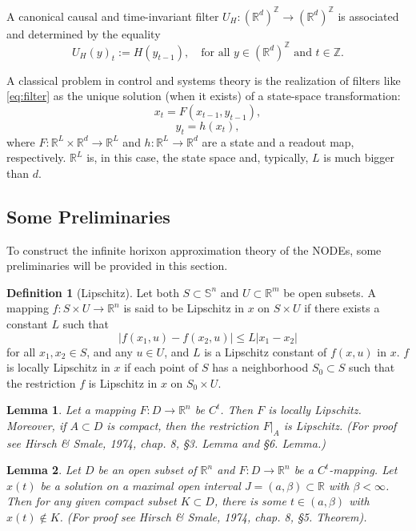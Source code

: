\documentclass{article}
\newtheorem{lemma}{Lemma}
\theoremstyle{definition}
\newtheorem{definition}{Definition}
\theoremstyle{remark}
\newcounter{ct}
\begin{document}
A canonical causal and time-invariant filter \( U_H : (\mathbb{R}^d)^{\mathbb{Z}} \rightarrow (\mathbb{R}^d)^{\mathbb{Z}} \) is associated and determined by the equality 
\[
U_H(y)_t := H\left( y_{t-1} \right), \quad \text{for all } y \in (\mathbb{R}^d)^{\mathbb{Z}} \text{ and } t \in \mathbb{Z}.
\]

A classical problem in control and systems theory is the realization of filters like \ref{eq:filter} as the unique solution (when it exists) of a state-space transformation:
\begin{equation}
x_t = F(x_{t-1}, y_{t-1}),
\end{equation}
\begin{equation}
y_t = h(x_t),
\end{equation}
where \( F : \mathbb{R}^L \times \mathbb{R}^d \rightarrow \mathbb{R}^L \) and \( h : \mathbb{R}^L \rightarrow \mathbb{R}^d \) are a state and a readout map, respectively. \( \mathbb{R}^L \) is, in this case, the state space and, typically, \( L \) is much bigger than \( d \).

\subsection{Some Preliminaries}
To construct the infinite horixon approximation theory of the NODEs, some preliminaries will be provided in this section.

\begin{definition}[Lipschitz]
 Let both $S \subset \mathbb{S}^n$ and $U \subset \mathbb{R}^m$ be open subsets.
 A mapping $f: S \times U \rightarrow \mathbb{R}^n$ is said to be Lipschitz in $x$ on $S \times U$ if there exists a constant $L$ such that
\[
|f(x_1, u) - f(x_2, u)| \leq L |x_1 - x_2|
\]
for all $x_1, x_2 \in S$, and any $u \in U$, and $L$ is a Lipschitz constant of $f(x, u)$ in $x$. $f$ is locally Lipschitz in $x$ if each point of $S$ has a neighborhood $S_0 \subset S$ such that the restriction $f$ is Lipschitz in $x$ on $S_0 \times U$.
\end{definition}


\begin{lemma}
Let a mapping \( F : D \to \mathbb{R}^n \) be \( C^t \). 
Then \( F \) is locally Lipschitz. Moreover, if \( A \subset D \) is compact, then the restriction \( F|_A \) is Lipschitz.
(For proof see Hirsch \& Smale, 1974, chap. 8, §3. Lemma and §6. Lemma.)
\end{lemma}	


\begin{lemma}
Let \( D \) be an open subset of \( \mathbb{R}^n \) and \( F : D \to \mathbb{R}^n \) be a \( C^t \)-mapping. 
Let \( x(t) \) be a solution on a maximal open interval \( J = (a, \beta) \subset \mathbb{R} \) with \( \beta < \infty \). 
Then for any given compact subset \( K \subset D \), there is some \( t \in (a, \beta) \) with \( x(t) \notin K \). 
(For proof see Hirsch \& Smale, 1974, chap. 8, §5. Theorem).
\end{lemma}	
\end{document}
